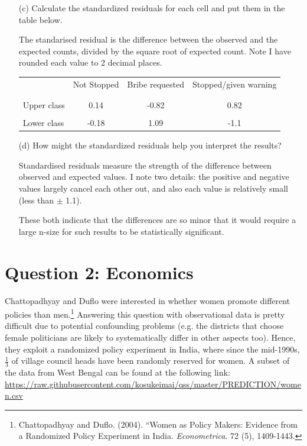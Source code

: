 \documentclass[12pt,letterpaper]{article}
\begin{document}
\begin{enumerate}
	\item [(c)] Calculate the standardized residuals for each cell and put them in the table below.
	
	\noindent The standarised residual is the difference between the observed and the expected counts, divided by the square root of expected count. Note I have rounded each value to 2 decimal places.
	
	
	
	\begin{table}[h]
		\centering
		\begin{tabular}{l | c c c }
			& Not Stopped & Bribe requested & Stopped/given warning \\
			\\[-1.8ex] 
			\hline \\[-1.8ex]
			Upper class  & 0.14 & -0.82 & 0.82 \\
			\\
			Lower class & -0.18 & 1.09 & -1.1  \\
			
		\end{tabular}
	\end{table}
	
	\vspace{2cm}
	\item [(d)] How might the standardized residuals help you interpret the results?  
	
	\noindent Standardised residuals measure the strength of the difference between observed and expected values. I note two details: the positive and negative values largely cancel each other out, and also each value is relatively small (less than $\pm$ 1.1).
	
	\noindent These both indicate that the differences are so minor that it would require a large n-size for such results to be statistically significant.
	
\end{enumerate}
\newpage

\section*{Question 2: Economics}
Chattopadhyay and Duflo were interested in whether women promote different policies than men.\footnote{Chattopadhyay and Duflo. (2004). ``Women as Policy Makers: Evidence from a Randomized Policy Experiment in India. \textit{Econometrica}. 72 (5), 1409-1443.} Answering this question with observational data is pretty difficult due to potential confounding problems (e.g. the districts that choose female politicians are likely to systematically differ in other aspects too). Hence, they exploit a randomized policy experiment in India, where since the mid-1990s, $\frac{1}{3}$ of village council heads have been randomly reserved for women. A subset of the data from West Bengal can be found at the following link: \url{https://raw.githubusercontent.com/kosukeimai/qss/master/PREDICTION/women.csv}\\
\end{document}
